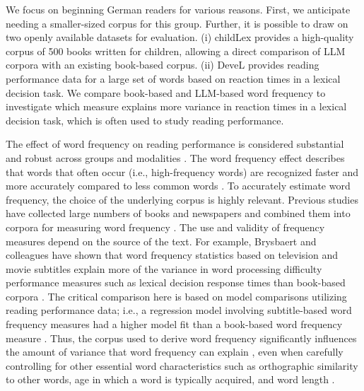 \documentclass[doc, a4paper, anonymous]{apa7}
\begin{document}
We focus on beginning German readers for various reasons. First, we anticipate needing a smaller-sized corpus for this group. Further, it is possible to draw on two openly available datasets for evaluation. (i) childLex \citep{schroeder_childlex_2015} provides a high-quality corpus of 500 books written for children, allowing a direct comparison of LLM corpora with an existing book-based corpus. (ii) DeveL \citep{schroter_developmental_2017} provides reading performance data for a large set of words based on reaction times in a lexical decision task. We compare book-based and LLM-based word frequency to investigate which measure explains more variance in reaction times in a lexical decision task, which is often used to study reading performance.

The effect of word frequency on reading performance is considered substantial and robust \citep{brysbaert_impact_2016, brysbaert_word_2018} across groups \citep[e.g.,][]{hawelka_dual-route_2010} and modalities \citep[e.g.,][]{gregorova_access_2023}. The word frequency effect describes that words that often occur (i.e., high-frequency words) are recognized faster and more accurately compared to less common words \citep[i.e., low-frequency words; ][]{adelman_contextual_2006, baayen_demythologizing_2010, brysbaert_impact_2016, gregorova_access_2023, hallin_effects_2018, lieven_input_2010, mcdonald_rethinking_2001, stokes_neighborhood_2010}. To accurately estimate word frequency, the choice of the underlying corpus is highly relevant. Previous studies have collected large numbers of books and newspapers and combined them into corpora for measuring word frequency \citep[e.g.,][]{baayen_celex_1993, heister_dlexdb_2011}. The use and validity of frequency measures depend on the source of the text. For example, Brysbaert and colleagues \citep{brysbaert_word_2011, brysbaert_word_2018} have shown that word frequency statistics based on television and movie subtitles explain more of the variance in word processing difficulty performance measures such as lexical decision response times than book-based corpora \citep[see also][]{chilson_films_2024}. The critical comparison here is based on model comparisons utilizing reading performance data; i.e., a regression model involving subtitle-based word frequency measures had a higher model fit than a book-based word frequency measure \citep[see, e.g.,][]{brysbaert_word_2011}. Thus, the corpus used to derive word frequency significantly influences the amount of variance that word frequency can explain \citep{ferrand_french_2010, keuleers_subtlex-nl_2010, van_heuven_subtlex-uk_2014}, even when carefully controlling for other essential word characteristics such as orthographic similarity to other words, age in which a word is typically acquired, and word length \citep{graf_faktorenanalyse_2005}. 
\end{document}
